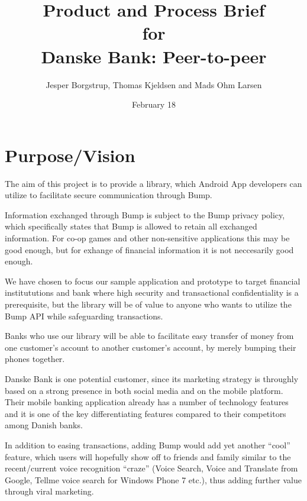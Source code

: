 \documentclass[a4paper,11pt]{article}
\title{Product and Process Brief\\\small{for}\\\small{Danske Bank: Peer-to-peer}}
\author{ Jesper Borgstrup, Thomas Kjeldsen and Mads Ohm Larsen }
\date{February 18}
\begin{document}
\ifpdf
{}
\else
{}
\fi

\maketitle

\tableofcontents
\vspace{2cm}

\pagebreak 

\section{Purpose/Vision} %
\label{sec:purpose_vision}

The aim of this project is to provide a library, which Android App developers can utilize to facilitate secure communication through Bump.

Information exchanged through Bump is subject to the Bump privacy policy, which specifically states that Bump is allowed to retain all exchanged information. For co-op games and other non-sensitive applications this may be good enough, but for exhange of financial information it is not neccesarily good enough.

We have chosen to focus our sample application and prototype to target financial institututions and bank where high security and transactional confidentiality is a prerequisite, but the library will be of value to anyone who wants to utilize the Bump API while safeguarding transactions.

Banks who use our library will be able to facilitate easy transfer of money from one customer's account to another customer's account, by merely bumping their phones together.

Danske Bank is one potential customer, since its marketing strategy is throughly based on a strong presence in both social media and on the mobile platform. Their mobile banking application already has a number of technology features and it is one of the key differentiating features compared to their competitors among Danish banks.

In addition to easing transactions, adding Bump would add yet another ``cool'' feature, which users will hopefully show off to friends and family similar to the recent/current voice recognition ``craze'' (Voice Search, Voice and Translate from Google, Tellme voice search for Windows Phone 7 etc.), thus adding further value through viral marketing.
\end{document}
